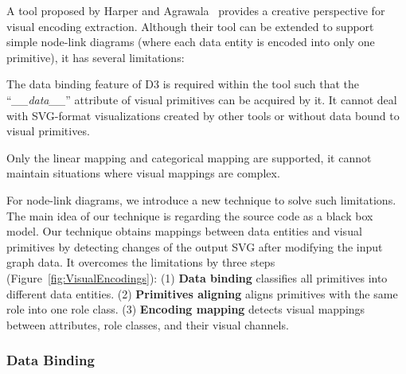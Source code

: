 A tool proposed by Harper and Agrawala~\cite{DBLP:conf/uist/HarperA14} provides a creative perspective for visual encoding extraction.
Although their tool can be extended to support simple node-link diagrams (where each data entity is encoded into only one primitive), it has several limitations:
\begin{compactenum}

\item The data binding feature of D3 is required within the tool such that the ``\textit{\_\_data\_\_}'' attribute of visual primitives can be acquired by it. 
It cannot deal with SVG-format visualizations created by other tools or without data bound to visual primitives.

\item Only the linear mapping and categorical mapping are supported, it cannot maintain situations where visual mappings are complex.

\end{compactenum}

For node-link diagrams, we introduce a new technique to solve such limitations.
The main idea of our technique is regarding the source code as a black box model.
Our technique obtains mappings between data entities and visual primitives by detecting changes of the output SVG after modifying the input graph data.
It overcomes the limitations by three steps (Figure~\ref{fig:VisualEncodings}):
(1) \textbf{Data binding} classifies all primitives into different data entities.
(2) \textbf{Primitives aligning} aligns primitives with the same role into one role class. 
(3) \textbf{Encoding mapping} detects visual mappings between attributes, role classes, and their visual channels.

\subsubsection{Data Binding} \label{sec:databinding}

